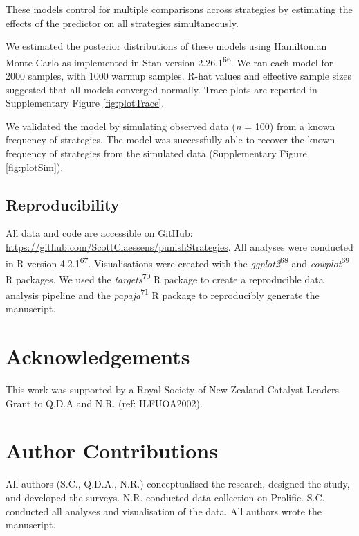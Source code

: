 \documentclass[
  man,floatsintext]{apa6}
\begin{document}
These models control for multiple comparisons across strategies by estimating
the effects of the predictor on all strategies simultaneously.

We estimated the posterior distributions of these models using Hamiltonian Monte
Carlo as implemented in Stan version 2.26.1\textsuperscript{66}. We ran each model for
2000 samples, with 1000 warmup samples. R-hat values and effective sample sizes
suggested that all models converged normally. Trace plots are reported in
Supplementary Figure \ref{fig:plotTrace}.

We validated the model by simulating observed data (\emph{n} = 100) from a known
frequency of strategies. The model was successfully able to recover the known
frequency of strategies from the simulated data (Supplementary Figure
\ref{fig:plotSim}).

\hypertarget{reproducibility}{%
\subsection{Reproducibility}\label{reproducibility}}

All data and code are accessible on GitHub:
\url{https://github.com/ScottClaessens/punishStrategies}. All analyses were conducted
in R version 4.2.1\textsuperscript{67}. Visualisations were created with the \emph{ggplot2}\textsuperscript{68} and \emph{cowplot}\textsuperscript{69} R packages. We used the \emph{targets}\textsuperscript{70} R package to create a reproducible data analysis pipeline and the
\emph{papaja}\textsuperscript{71} R package to reproducibly generate the manuscript.

\newpage
\nolinenumbers

\hypertarget{acknowledgements}{%
\section{Acknowledgements}\label{acknowledgements}}

This work was supported by a Royal Society of New Zealand Catalyst Leaders Grant
to Q.D.A and N.R. (ref: ILFUOA2002).

\hypertarget{author-contributions}{%
\section{Author Contributions}\label{author-contributions}}

All authors (S.C., Q.D.A., N.R.) conceptualised the research, designed the
study, and developed the surveys. N.R. conducted data collection on Prolific.
S.C. conducted all analyses and visualisation of the data. All authors wrote the
manuscript.
\end{document}

